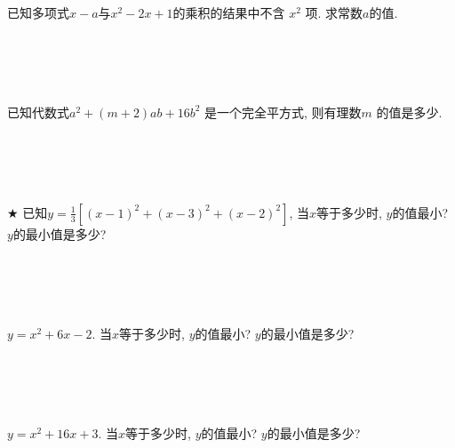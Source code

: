 \item {
    已知多项式$x-a$与$x^2 - 2x + 1$的乘积的结果中不含 $x^2$ 项. 求常数$a$的值. 
    \ifshowSolution
        \fangsong{}
        \\
    \else
        \\ \\ \\ \\ 
    \fi
}

\item {
    已知代数式$a^2 + (m+2)ab+ 16b^2$ 是一个完全平方式, 则有理数$m$ 的值是多少. 
    \ifshowSolution
        \fangsong{}
        \\
    \else
        \\ \\ \\ \\ 
    \fi
}

\item {
    $\bigstar$
    已知$y=\frac13 [(x - 1)^2 + (x - 3)^2 + (x - 2)^2]$, 当$x$等于多少时, $y$的值最小? $y$的最小值是多少? 
    \ifshowSolution
        \fangsong{}
        \\
    \else
        \\ \\ \\ \\ 
    \fi
}

\item {
    $y=x^2 + 6x - 2$. 当$x$等于多少时, $y$的值最小? $y$的最小值是多少? 
    \ifshowSolution
        \fangsong{}
        \\
    \else
        \\ \\ \\ \\ 
    \fi
}

\item {
    $y=x^2 + 16x + 3$. 当$x$等于多少时, $y$的值最小? $y$的最小值是多少? 
    \ifshowSolution
        \fangsong{}
        \\
    \else
        \\ \\ \\ \\ 
    \fi
}


